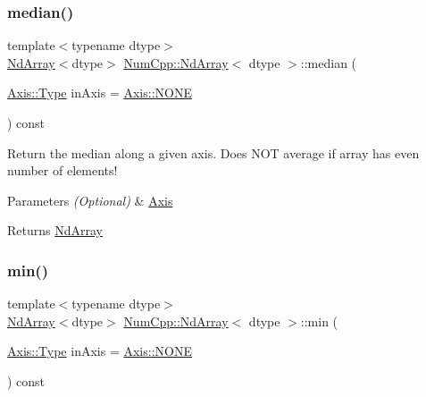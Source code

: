 \subsubsection{\texorpdfstring{median()}{median()}}
{\footnotesize\ttfamily template$<$typename dtype$>$ \\
\mbox{\hyperlink{class_num_cpp_1_1_nd_array}{Nd\+Array}}$<$dtype$>$ \mbox{\hyperlink{class_num_cpp_1_1_nd_array}{Num\+Cpp\+::\+Nd\+Array}}$<$ dtype $>$\+::median (\begin{DoxyParamCaption}\item[{\mbox{\hyperlink{struct_num_cpp_1_1_axis_ac10eb76f8631762d9ed70c40c42ca6cb}{Axis\+::\+Type}}}]{in\+Axis = {\ttfamily \mbox{\hyperlink{struct_num_cpp_1_1_axis_ac10eb76f8631762d9ed70c40c42ca6cba747ae657022cca1d87702b56d0c038e9}{Axis\+::\+N\+O\+NE}}} }\end{DoxyParamCaption}) const\hspace{0.3cm}{\ttfamily [inline]}}

Return the median along a given axis. Does N\+OT average if array has even number of elements!


\begin{DoxyParams}{Parameters}
{\em (\+Optional)} & \mbox{\hyperlink{struct_num_cpp_1_1_axis}{Axis}} \\
\hline
\end{DoxyParams}
\begin{DoxyReturn}{Returns}
\mbox{\hyperlink{class_num_cpp_1_1_nd_array}{Nd\+Array}} 
\end{DoxyReturn}
\mbox{\label{class_num_cpp_1_1_nd_array_a73200d9c70104cc8779916b426e2b3bb}} 
\subsubsection{\texorpdfstring{min()}{min()}}
{\footnotesize\ttfamily template$<$typename dtype$>$ \\
\mbox{\hyperlink{class_num_cpp_1_1_nd_array}{Nd\+Array}}$<$dtype$>$ \mbox{\hyperlink{class_num_cpp_1_1_nd_array}{Num\+Cpp\+::\+Nd\+Array}}$<$ dtype $>$\+::min (\begin{DoxyParamCaption}\item[{\mbox{\hyperlink{struct_num_cpp_1_1_axis_ac10eb76f8631762d9ed70c40c42ca6cb}{Axis\+::\+Type}}}]{in\+Axis = {\ttfamily \mbox{\hyperlink{struct_num_cpp_1_1_axis_ac10eb76f8631762d9ed70c40c42ca6cba747ae657022cca1d87702b56d0c038e9}{Axis\+::\+N\+O\+NE}}} }\end{DoxyParamCaption}) const\hspace{0.3cm}{\ttfamily [inline]}}

